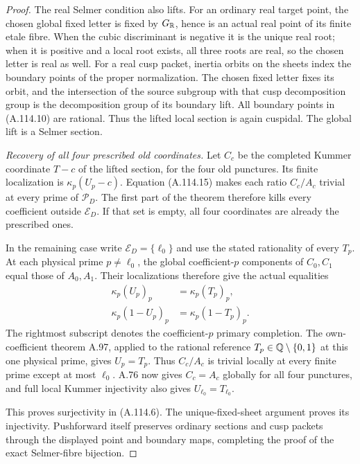 \begin{proof}
The real Selmer condition also lifts.
For an ordinary real target point,
the chosen global fixed letter is
fixed by $G_\mathbb R$, hence is an actual
real point of its finite etale fibre.
When the cubic discriminant is
negative it is the unique real root;
when it is positive and a local
root exists, all three roots are
real, so the chosen letter is real
as well.
For a real cusp packet, inertia
orbits on the sheets index the
boundary points of the proper
normalization.  The chosen fixed
letter fixes its orbit, and the
intersection of the source subgroup
with that cusp decomposition group
is the decomposition group of its
boundary lift.
All boundary points in (A.114.10)
are rational.  Thus the lifted
local section is again cuspidal.
The global lift is a Selmer section.

\emph{Recovery of all four prescribed old coordinates.}
Let $C_c$ be the completed Kummer
coordinate $T-c$ of the lifted
section, for the four old punctures.
Its finite localization is
$\kappa_p(U_p-c)$.
Equation (A.114.15) makes each ratio
$C_c/A_c$ trivial at every prime of
$\mathcal P_D$.
The first part of the theorem
therefore kills every coefficient
outside $\mathcal E_D$.
If that set is empty, all four
coordinates are already the
prescribed ones.

In the remaining case write
$\mathcal E_D=\{\ell_0\}$ and use
the stated rationality of every
$T_p$.
At each physical prime $p\ne\ell_0$,
the global coefficient-$p$ components
of $C_0,C_1$ equal those of $A_0,A_1$.
Their localizations therefore give
the actual equalities
\[
 \begin{split}
  \kappa_p(U_p)_p&=\kappa_p(T_p)_p,\\
  \kappa_p(1-U_p)_p&=\kappa_p(1-T_p)_p.
 \end{split}
\tag{A.114.16}
\]
The rightmost subscript denotes the
coefficient-$p$ primary completion.
The own-coefficient theorem A.97,
applied to the rational reference
$T_p\in\mathbb Q\setminus\{0,1\}$ at
this one physical prime, gives
$U_p=T_p$.
Thus $C_c/A_c$ is trivial locally
at every finite prime except at
most $\ell_0$.
A.76 now gives $C_c=A_c$ globally
for all four punctures, and full
local Kummer injectivity also
gives $U_{\ell_0}=T_{\ell_0}$.

This proves surjectivity in
(A.114.6).
The unique-fixed-sheet argument
proves its injectivity.
Pushforward itself preserves
ordinary sections and cusp packets
through the displayed point and
boundary maps, completing the
proof of the exact Selmer-fibre
bijection.
\end{proof}

